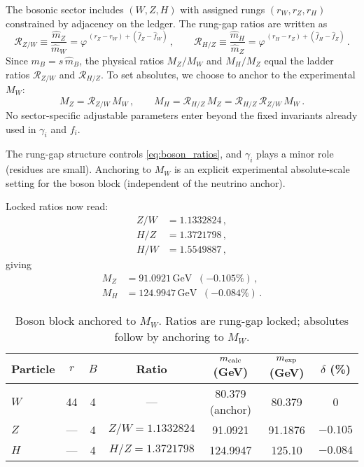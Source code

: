 \documentclass[%
amsmath,amssymb,
aps,
prb,
floatfix,showkeys
]{revtex4-2}
\begin{document}
The bosonic sector includes $(W,Z,H)$ with assigned rungs $(r_W,r_Z,r_H)$ constrained by adjacency on the ledger. The rung-gap ratios are written as
\begin{equation}
  \mathcal{R}_{Z/W} \equiv \frac{\widehat m_Z}{\widehat m_W}
  = \varphi^{\,(r_Z-r_W) + (\widehat f_Z - \widehat f_W)}\,,\qquad
  \mathcal{R}_{H/Z} \equiv \frac{\widehat m_H}{\widehat m_Z}
  = \varphi^{\,(r_H-r_Z) + (\widehat f_H - \widehat f_Z)}\,.
  \label{eq:boson_ratios}
\end{equation}
Since $m_B=s\,\widehat m_B$, the physical ratios $M_Z/M_W$ and $M_H/M_Z$ equal the ladder ratios $\mathcal{R}_{Z/W}$ and $\mathcal{R}_{H/Z}$. To set absolutes, we choose to anchor to the experimental $M_W$:
\begin{equation}
  M_Z = \mathcal{R}_{Z/W}\,M_W\,,\qquad
  M_H = \mathcal{R}_{H/Z}\,M_Z = \mathcal{R}_{H/Z}\,\mathcal{R}_{Z/W}\,M_W\,.
  \label{eq:boson_absolutes}
\end{equation}
No sector-specific adjustable parameters enter beyond the fixed invariants already used in $\gamma_i$ and $f_i$.

The rung-gap structure controls \eqref{eq:boson_ratios}, and $\gamma_i$ plays a minor role (residues are small). Anchoring to $M_W$ is an explicit experimental absolute-scale setting for the boson block (independent of the neutrino anchor).

Locked ratios now read:
\begin{align}
Z/W &= 1.1332824\,,\nonumber\\
H/Z &= 1.3721798\,,\\
H/W &= 1.5549887\,,\nonumber
\end{align}
giving
\begin{align}
M_Z &= 91.0921\,\text{GeV}\;\;(-0.105\%)\,,\nonumber\\
M_H &= 124.9947\,\text{GeV}\;\;(-0.084\%)\,.
\end{align}

\begin{table}[H]
\caption{Boson block anchored to $M_W$. Ratios are rung-gap locked; absolutes follow by anchoring to $M_W$.}
\label{tab:bosons}
\begin{tabular}{l c c c c c c}
\hline
Particle & $r$ & $B$ & Ratio & $m_{\rm calc}$ (GeV) & $m_{\rm exp}$ (GeV) & $\delta$ (\%) \\
\hline
$W$ & 44  & 4 & ---             & 80.379 (anchor) & 80.379   & 0 \\
$Z$ & --- & 4 & $Z/W=1.1332824$ & 91.0921         & 91.1876  & $-0.105$ \\
$H$ & --- & 4 & $H/Z=1.3721798$ & 124.9947        & 125.10   & $-0.084$ \\
\hline
\end{tabular}
\end{table}
\end{document}
